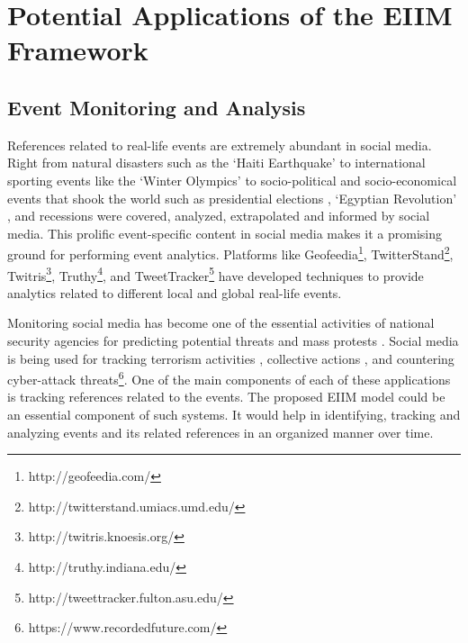 
\chapter{Potential Applications of the EIIM Framework} %

\label{applications} %

\doublespacing
\setlength{\parindent}{1cm}
\section{Event Monitoring and Analysis}
References related to real-life events are extremely abundant in social media. Right from natural disasters such as the `Haiti Earthquake' \cite{gao2011harnessing} to international sporting events like the `Winter Olympics' \cite{walker2013russia} to socio-political \cite{singh2010mining} and socio-economical \cite{bollen2009modeling} events that shook the world such as presidential elections \cite{metzgar2009social}, `Egyptian Revolution' \cite{choudhary2012social}, and recessions were covered, analyzed, extrapolated and informed by social media. This prolific event-specific content in social media makes it a promising ground for performing event analytics. Platforms like Geofeedia\footnote{http://geofeedia.com/}, TwitterStand\footnote{http://twitterstand.umiacs.umd.edu/}, Twitris\footnote{http://twitris.knoesis.org/}, Truthy\footnote{http://truthy.indiana.edu/}, and TweetTracker\footnote{http://tweettracker.fulton.asu.edu/}  have developed techniques to provide analytics related to different local and global real-life events. 

Monitoring social media has become one of the essential activities of national security agencies for predicting potential threats and mass protests \cite{ghannam2011social}. Social media is being used for tracking terrorism activities \cite{oh2011information}, collective actions \cite{agarwal2014online}, and countering cyber-attack threats\footnote{https://www.recordedfuture.com/}. One of the main components of each of these applications is tracking references related to the events. The proposed EIIM model could be an essential component of such systems. It would help in identifying, tracking and analyzing events and its related references in an organized manner over time.



